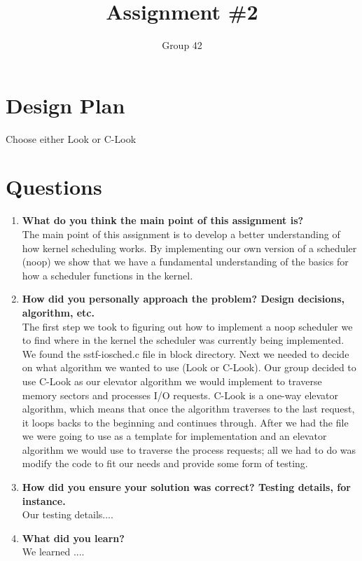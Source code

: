 \documentclass[letterpaper,10pt,notitlepage,fleqn]{article}
\title{Assignment \#2}
\author{Group 42}
\begin{document}
\maketitle
\clearpage


\section{Design Plan}
Choose either Look or C-Look

\section{Questions}
\begin{enumerate}
\item \textbf{What do you think the main point of this assignment is?}
\\	The main point of this assignment is to develop a better understanding of how kernel scheduling works. By implementing our own version of a scheduler (noop) we show that we have a fundamental understanding of the basics for how a scheduler functions in the kernel. 

\item \textbf{How did you personally approach the problem? Design decisions, algorithm, etc.}
\\ The first step we took to figuring out how to implement a noop scheduler we to find where in the kernel the scheduler was currently being implemented. We found the sstf-iosched.c file in block directory. Next we needed to decide on what algorithm we wanted to use (Look or C-Look). Our group decided to use C-Look as our elevator algorithm we would implement to traverse memory sectors and processes I/O requests. C-Look is a one-way elevator algorithm, which means that once the algorithm traverses to the last request, it loops backs to the beginning and continues through. After we had the file we were going to use as a template for implementation and an elevator algorithm we would use to traverse the process requests; all we had to do was modify the code to fit our needs and provide some form of testing. 

\item \textbf{How did you ensure your solution was correct? Testing details, for instance.}
\\ Our testing details....

\item \textbf{What did you learn?}
\\ We learned ....


\end{enumerate}
\end{document}
